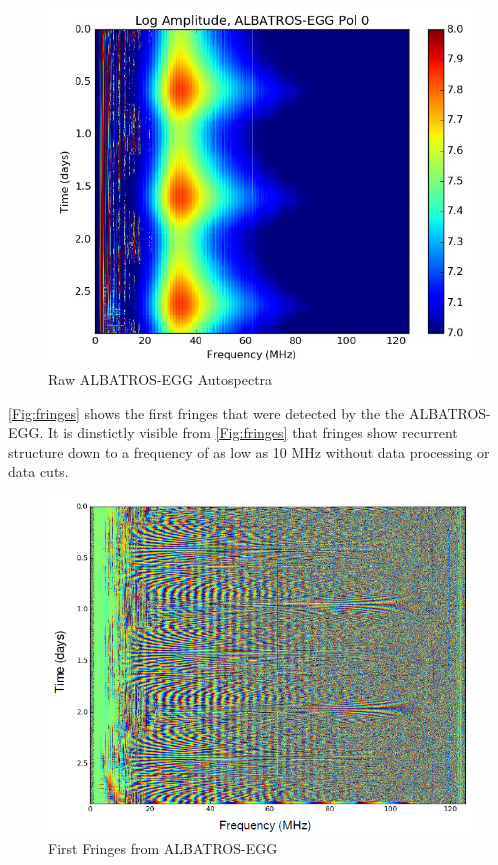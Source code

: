 \documentclass{ws-jai}
\begin{document}
{\begin{figure}[h!]
	\begin{center}
		\includegraphics[width=0.8\linewidth]{Figures/Raw-ALBATROS-autospectra.PNG}
		\caption{Raw ALBATROS-EGG Autospectra}
		\label{Fig:auto}
	\end{center}
\end{figure}

\autoref{Fig:fringes} shows the first fringes that were detected by the the ALBATROS-EGG. It is dinstictly visible from \autoref{Fig:fringes} that fringes show recurrent structure down to a frequency of as low as 10 MHz without data processing or data cuts.

\begin{figure}[ht!]
	\begin{center}
		\includegraphics[width=0.7\linewidth]{Figures/First-fringes-of-ALBATROS-EGG.PNG}
		\caption{First Fringes from ALBATROS-EGG}
		\label{Fig:fringes}
	\end{center}
\end{figure}

}
\end{document}
